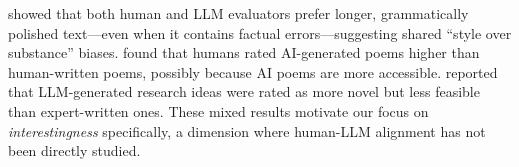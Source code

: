\citet{wu2023style} showed that both human and LLM evaluators prefer longer, grammatically polished text---even when it contains factual errors---suggesting shared ``style over substance'' biases.
\citet{porter2024ai} found that humans rated AI-generated poems higher than human-written poems, possibly because AI poems are more accessible.
\citet{si2024can} reported that LLM-generated research ideas were rated as more novel but less feasible than expert-written ones.
These mixed results motivate our focus on \emph{interestingness} specifically, a dimension where human-LLM alignment has not been directly studied.
